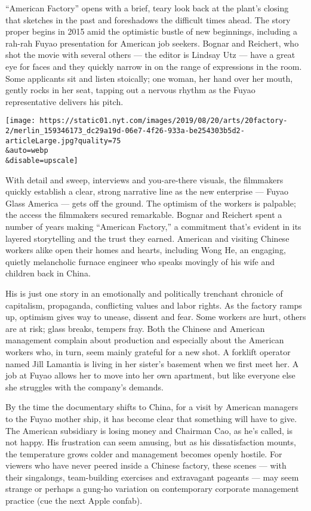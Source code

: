 ``American Factory'' opens with a brief, teary look back at the plant's
closing that sketches in the past and foreshadows the difficult times
ahead. The story proper begins in 2015 amid the optimistic bustle of new
beginnings, including a rah-rah Fuyao presentation for American job
seekers. Bognar and Reichert, who shot the movie with several others ---
the editor is Lindsay Utz --- have a great eye for faces and they
quickly narrow in on the range of expressions in the room. Some
applicants sit and listen stoically; one woman, her hand over her mouth,
gently rocks in her seat, tapping out a nervous rhythm as the Fuyao
representative delivers his pitch.

\texttt{[image: https://static01.nyt.com/images/2019/08/20/arts/20factory-2/merlin\_159346173\_dc29a19d-06e7-4f26-933a-be254303b5d2-articleLarge.jpg?quality=75\\\&auto=webp\\\&disable=upscale]}

With detail and sweep, interviews and you-are-there visuals, the
filmmakers quickly establish a clear, strong narrative line as the new
enterprise --- Fuyao Glass America --- gets off the ground. The optimism
of the workers is palpable; the access the filmmakers secured
remarkable. Bognar and Reichert spent a number of years making
``American Factory,'' a commitment that's evident in its layered
storytelling and the trust they earned. American and visiting Chinese
workers alike open their homes and hearts, including Wong He, an
engaging, quietly melancholic furnace engineer who speaks movingly of
his wife and children back in China.

His is just one story in an emotionally and politically trenchant
chronicle of capitalism, propaganda, conflicting values and labor
rights. As the factory ramps up, optimism gives way to unease, dissent
and fear. Some workers are hurt, others are at risk; glass breaks,
tempers fray. Both the Chinese and American management complain about
production and especially about the American workers who, in turn, seem
mainly grateful for a new shot. A forklift operator named Jill Lamantia
is living in her sister's basement when we first meet her. A job at
Fuyao allows her to move into her own apartment, but like everyone else
she struggles with the company's demands.

By the time the documentary shifts to China, for a visit by American
managers to the Fuyao mother ship, it has become clear that something
will have to give. The American subsidiary is losing money and Chairman
Cao, as he's called, is not happy. His frustration can seem amusing, but
as his dissatisfaction mounts, the temperature grows colder and
management becomes openly hostile. For viewers who have never peered
inside a Chinese factory, these scenes --- with their singalongs,
team-building exercises and extravagant pageants --- may seem strange or
perhaps a gung-ho variation on contemporary corporate management
practice (cue the next Apple confab).

